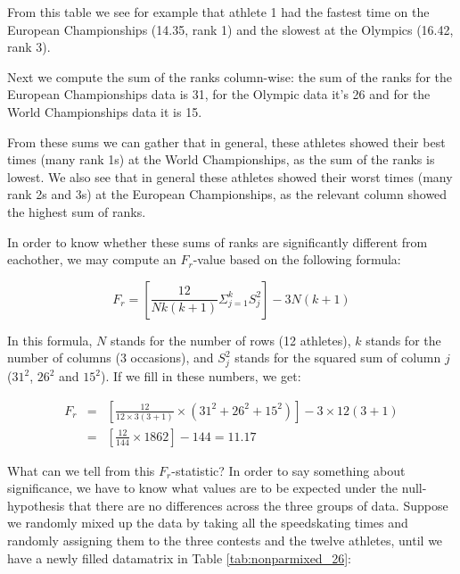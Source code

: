 \documentclass[]{book}\usepackage[]{graphicx}\usepackage[]{color}
\begin{document}
From this table we see for example that athlete 1 had the fastest time on the European Championships (14.35, rank 1) and the slowest at the Olympics (16.42, rank 3).


Next we compute the sum of the ranks column-wise: the sum of the ranks for the European Championships data is 31, for the Olympic data it's 26 and for the World Championships data it is 15.

From these sums we can gather that in general, these athletes showed their best times (many rank 1s) at the World Championships, as the sum of the ranks is lowest. We also see that in general these athletes showed their worst times (many rank 2s and 3s) at the European Championships, as the relevant column showed the highest sum of ranks.

In order to know whether these sums of ranks are significantly different from eachother, we may compute an $F_r$-value based on the following formula:


\begin{equation}
F_r = \left[  \frac{12}{Nk(k+1)} \Sigma^k_{j=1} S_j^2      \right] - 3N (k+1)
\end{equation}


In this formula, $N$ stands for the number of rows (12 athletes), $k$ stands for the number of columns (3 occasions), and $S_j^2$ stands for the squared sum of column $j$ ($31^2$, $26^2$ and $15^2$). If we fill in these numbers, we get:

\begin{eqnarray}
F_r &=& \left[  \frac{12}{12 \times  3(3+1)} \times (31^2 + 26^2 + 15^2)      \right] - 3 \times 12 (3+1) \nonumber \\
  &=&   \left[  \frac{12}{144} \times  1862      \right] - 144 = 11.17  \nonumber
\end{eqnarray}



What can we tell from this $F_r$-statistic? In order to say something about significance, we have to know what values are to be expected under the null-hypothesis that there are no differences across the three groups of data. Suppose we randomly mixed up the data by taking all the speedskating times and randomly assigning them to the three contests and the twelve athletes, until we have a newly filled datamatrix in Table \ref{tab:nonparmixed_26}:
\end{document}
